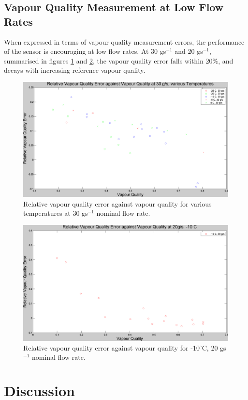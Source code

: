 \documentclass{report}
\begin{document}
\section{Vapour Quality Measurement at Low Flow Rates}
When expressed in terms of vapour quality measurement errors, the performance of the sensor is encouraging at low flow rates. At 30 gs$^{-1}$ and 20 gs$^{-1}$, summarised in figures \ref{plot:9} and \ref{plot:10}, the vapour quality error falls within 20\%, and decays with increasing reference vapour quality.
\begin{figure}
\includegraphics[width=\textwidth]{plots/fig9}
\caption{Relative vapour quality error against vapour quality for various temperatures at 30 gs$^{-1}$ nominal flow rate.}
\label{plot:9}
\end{figure}
\begin{figure}
\includegraphics[width=\textwidth]{plots/fig10}
\caption{Relative vapour quality error against vapour quality for -10$^\circ$C, 20 gs$^{-1}$ nominal flow rate.}
\label{plot:10}
\end{figure}
\FloatBarrier
\chapter{Discussion} \label{discussion}
\end{document}
